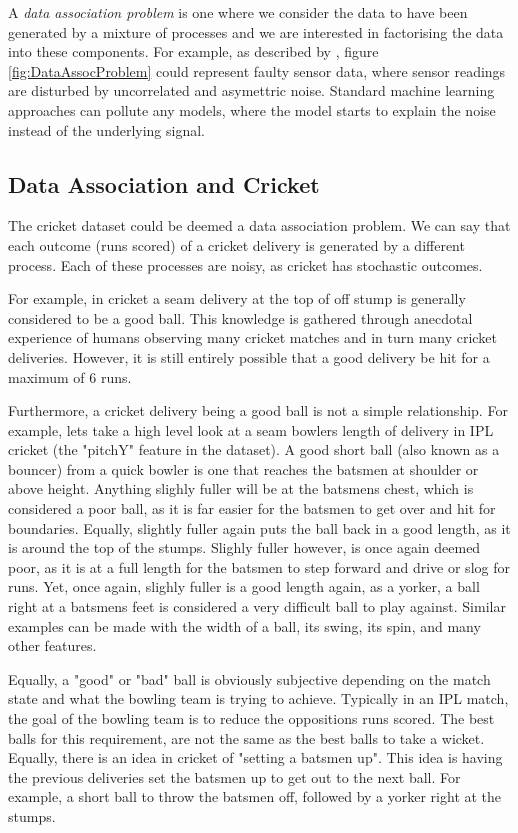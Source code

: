 \documentclass[12pt,a4paper]{report}
\theoremstyle{definition}
\begin{document}
A \emph{data association problem} is one where we consider the data to have been generated by a mixture of processes and we are interested in factorising the data into these components. For example, as described by \citet{Kaiser2018}, figure \ref{fig:DataAssocProblem} could represent faulty sensor data, where sensor readings are disturbed by uncorrelated and asymettric noise. Standard machine learning approaches can pollute any models, where the model starts to explain the noise instead of the underlying signal. 

\subsection{Data Association and Cricket}

The cricket dataset could be deemed a data association problem. 
We can say that each outcome (runs scored) of a cricket delivery is generated by a different process. 
Each of these processes are noisy, as cricket has stochastic outcomes. 

For example, in cricket a seam delivery at the top of off stump is generally considered to be a good ball. 
This knowledge is gathered through anecdotal experience of humans observing many cricket matches and in turn many cricket deliveries.
However, it is still entirely possible that a good delivery be hit for a maximum of 6 runs. 

Furthermore, a cricket delivery being a good ball is not a simple relationship. 
For example, lets take a high level look at a seam bowlers length of delivery in IPL cricket (the "pitchY" feature in the dataset).
A good short ball (also known as a bouncer) from a quick bowler is one that reaches the batsmen at shoulder or above height. 
Anything slighly fuller will be at the batsmens chest, which is considered a poor ball, as it is far easier for the batsmen to get over and hit for boundaries.
Equally, slightly fuller again puts the ball back in a good length, as it is around the top of the stumps. 
Slighly fuller however, is once again deemed poor, as it is at a full length for the batsmen to step forward and drive or slog for runs. 
Yet, once again, slighly fuller is a good length again, as a yorker, a ball right at a batsmens feet is considered a very difficult ball to play against. 
Similar examples can be made with the width of a ball, its swing, its spin, and many other features.

Equally, a "good" or "bad" ball is obviously subjective depending on the match state and what the bowling team is trying to achieve. 
Typically in an IPL match, the goal of the bowling team is to reduce the oppositions runs scored. 
The best balls for this requirement, are not the same as the best balls to take a wicket. 
Equally, there is an idea in cricket of "setting a batsmen up". 
This idea is having the previous deliveries set the batsmen up to get out to the next ball. 
For example, a short ball to throw the batsmen off, followed by a yorker right at the stumps. 
\end{document}
